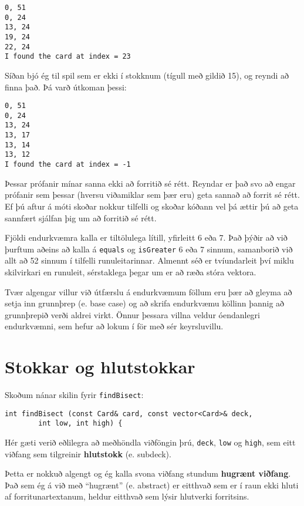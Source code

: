 \begin{verbatim}
0, 51
0, 24
13, 24
19, 24
22, 24
I found the card at index = 23
\end{verbatim}
%
Síðan bjó ég til spil sem er ekki í stokknum (tígull með gildið 15),
og reyndi að finna það. Þá varð útkoman þessi:

\begin{verbatim}
0, 51
0, 24
13, 24
13, 17
13, 14
13, 12
I found the card at index = -1
\end{verbatim}
%
Þessar prófanir mínar sanna ekki að forritið sé rétt.
Reyndar er það svo að engar prófanir sem þessar (hversu viðamiklar sem þær eru) geta sannað að forrit sé rétt.
Ef þú aftur á móti skoðar nokkur tilfelli og skoðar kóðann vel þá ættir þú að geta sannfært sjálfan þig um að forritið sé rétt.


Fjöldi endurkvæmra kalla er tiltölulega lítill, yfirleitt 6 eða 7.
Það þýðir að við þurftum aðeins að kalla á {\tt equals} og {\tt isGreater} 6 eða 7 sinnum, 
samanborið við allt að 52 sinnum í tilfelli runuleitarinnar.
Almennt séð er tvíundarleit því miklu skilvirkari en runuleit, sérstaklega þegar um er að ræða stóra vektora.

Tvær algengar villur við útfærslu á endurkvæmum föllum eru þær að gleyma að setja inn grunnþrep (e. base case)
og að skrifa endurkvæmu köllinn þannig að grunnþrepið verði aldrei virkt.
Önnur þessara villna veldur óendanlegri endurkvæmni, sem hefur að lokum í för með sér keyrsluvillu.


\section{Stokkar og hlutstokkar}

Skoðum nánar skilin fyrir {\tt findBisect}:

\begin{verbatim}
int findBisect (const Card& card, const vector<Card>& deck,
		int low, int high) {
\end{verbatim}
%
Hér gæti verið eðlilegra að meðhöndla viðföngin þrú, {\tt deck}, {\tt low} og {\tt high},
sem eitt viðfang sem tilgreinir {\bf hlutstokk} (e. subdeck).


Þetta er nokkuð algengt og ég kalla svona viðfang stundum {\bf hugrænt viðfang}.
Það sem ég á við með ``hugrænt'' (e. abstract) er eitthvað sem er í raun ekki hluti af forritunartextanum, 
heldur eitthvað sem lýsir hlutverki forritsins.

